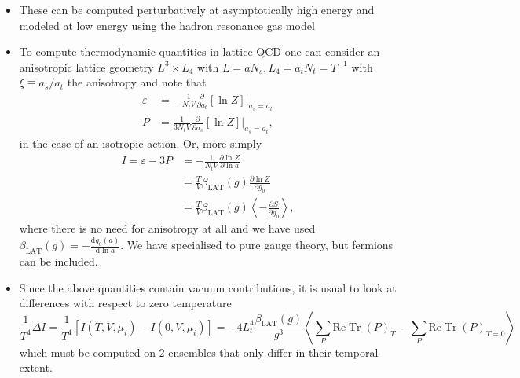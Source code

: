 \begin{itemize}
    \item These can be computed perturbatively at asymptotically high energy and modeled at low energy using the hadron resonance gas model
    \item To compute thermodynamic quantities in lattice QCD one can consider an anisotropic lattice geometry $L^3 \times L_4$ with $L = a N_s, L_4 = a_t N_t = T^{-1}$ with $\xi \equiv a_s/a_t$ the anisotropy and note that
\begin{align}
\varepsilon &= -\frac{1}{N_t V}\frac{\partial}{\partial a_t}[\ln Z]|_{a_s = a_t} \nonumber \\
P &= \frac{1}{3 N_t V}\frac{\partial}{\partial a_s}[\ln Z]|_{a_s = a_t},
\end{align}
in the case of an isotropic action. Or, more simply
\begin{align}
\label{eq:int_measure}
    I = \varepsilon - 3 P &= -\frac{1}{N_t V} \frac{\partial \ln Z}{\partial \ln a}\nonumber \\
    &= \frac{T}{V}\beta_\text{LAT}(g) \frac{\partial \ln Z}{\partial g_0} \nonumber \\
    &= \frac{T}{V}\beta_\text{LAT}(g) \left \langle - \frac{\partial S}{\partial g_0}\right \rangle,
\end{align}
where there is no need for anisotropy at all and we have used $\beta_\text{LAT}(g) = -\frac{\text{d}g_0(a)}{\text{d}\ln a}$. We have specialised to pure gauge theory, but fermions can be included.

    \item Since the above quantities contain vacuum contributions, it is usual to look at differences with respect to zero temperature
\begin{equation}
    \frac{1}{T^4}\Delta I = \frac{1}{T^4}[I(T,V,\mu_i) - I(0,V,\mu_i)] = -4 L_t^4 \frac{\beta_\text{LAT}(g)}{g^3}\left\langle\sum_P \text{Re} \operatorname{Tr}(P)_T - \sum_P \text{Re} \operatorname{Tr}(P)_{T=0}\right\rangle
\end{equation}
which must be computed on $2$ ensembles that only differ in their temporal extent.


\end{itemize}
